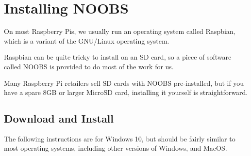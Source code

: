 \section{Installing NOOBS}
\label{sec:NOOBS}

	On most Raspberry Pis, we usually run an operating system called Raspbian, which is a variant of the GNU/Linux operating system.
	
	
	Raspbian can be quite tricky to install on an SD card, so a piece of software called NOOBS is provided to do most of the work for us.
	
	Many Raspberry Pi retailers sell SD cards with NOOBS pre-installed, but if you have a spare 8GB or larger MicroSD card, installing it yourself is straightforward.

	\subsection{Download and Install}
	
	The following instructions are for Windows 10, but should be fairly similar to most operating systems, including other versions of Windows, and MacOS.
		
